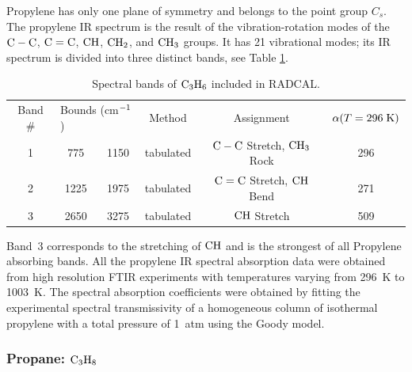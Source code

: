 Propylene has only one plane of symmetry and belongs to the point group $C_s$. The propylene IR spectrum is the result of the vibration-rotation modes of the $\rm C-C$, $\rm C=C$, $\rm CH$, $\rm CH_2$, and $\rm CH_3$ groups. It has 21 vibrational modes; its IR spectrum is divided into three distinct bands, see Table \ref{Table::C3H6}.
\begin{table}[ht]
   \centering
   \caption{Spectral bands of $\rm C_3H_6$ included in RADCAL.}
   \vspace{0.1in}
   \label{Table::C3H6}
   \begin{tabular}{|c|c|c|c|c|c|}
    \hline
    Band \# & \multicolumn{2}{|l|}{Bounds (cm$\rm ^{-1}$) } & Method & Assignment & $\alpha(T=296 \; {\rm K})$\\
    \cline{1-6}
    1 & 775  & 1150 & tabulated &  $\rm C-C$ Stretch, $\rm CH_3$ Rock & 296 \\
    2 & 1225 & 1975 & tabulated &  $\rm C=C$ Stretch, $\rm CH$ Bend   & 271 \\
    3 & 2650 & 3275 & tabulated &  $\rm CH$ Stretch                   & 509 \\
    \hline
   \end{tabular}
\end{table}
Band~3 corresponds to the stretching of $\rm CH$ and is the strongest of all Propylene absorbing bands. All the propylene IR spectral absorption data were obtained from high resolution FTIR experiments with temperatures varying from 296~K to 1003~K. The spectral absorption coefficients were obtained by fitting the experimental spectral transmissivity of a homogeneous column of isothermal propylene with a total pressure of 1~atm using the Goody model.

\subsubsection{Propane: $\rm C_3H_8$}

